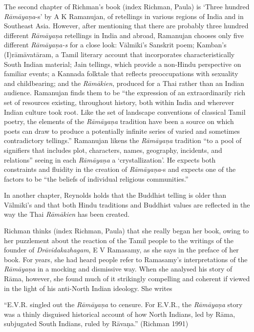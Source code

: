 \item The second chapter of Richman’s book (index Richman, Paula) is ‘Three hundred \textit{Rāmāyaṇa}-s’ by A K Ramanujan, of retellings in various regions of India and in Southeast Asia. However, after mentioning that there are probably three hundred different \textit{Rāmāyaṇa } retellings in India and abroad, Ramanujan chooses only five different \textit{Rāmāyaṇa-s} for a close look: Vālmīki's Sanskrit poem; Kamban's (I)rāmāvatāram, a Tamil literary account that incorporates characteristically South Indian material; Jain tellings, which provide a non-Hindu perspective on familiar events; a Kannada folktale that reflects preoccupations with sexuality and childbearing; and the \textit{Rāmākien}, produced for a Thai rather than an Indian audience. Ramanujan finds them to be “the expression of an extraordinarily rich set of resources existing, throughout history, both within India and wherever Indian culture took root. Like the set of landscape conventions of classical Tamil poetry, the elements of the \textit{Rāmāyaṇa} tradition have been a source on which poets can draw to produce a potentially infinite series of varied and sometimes contradictory tellings.” Ramanujan likens the \textit{Rāmāyaṇa} tradition “to a pool of signifiers that includes plot, characters, names, geography, incidents, and relations” seeing in each \textit{Rāmāyaṇa} a ‘crystallization’. He expects both constraints and fluidity in the creation of \textit{Rāmāyaṇa}-s and expects one of the factors to be “the beliefs of individual religious communities.”

 \item In another chapter, Reynolds holds that the Buddhist telling is older than Vālmīki’s and that both Hindu traditions and Buddhist values are reflected in the way the Thai \textit{Rāmākien} has been created.

 \item Richman thinks (index Richman, Paula) that she really began her book, owing to her puzzlement about the reaction of the Tamil people to the writings of the founder of \textit{Drāvidakazhagam}, E V Ramasamy, as she says in the preface of her book. For years, she had heard people refer to Ramasamy’s interpretations of the \textit{Rāmāyaṇa} in a mocking and dismissive way. When she analysed his story of Rāma, however, she found much of it strikingly compelling and coherent if viewed in the light of his anti-North Indian ideology. She writes


\begin{myquote}
“E.V.R. singled out the \textit{Rāmāyaṇa} to censure. For E.V.R., the \textit{Rāmāyaṇa} story was a thinly disguised historical account of how North Indians, led by Rāma, subjugated South Indians, ruled by Rāvaṇa.” (Richman 1991)
\end{myquote}

